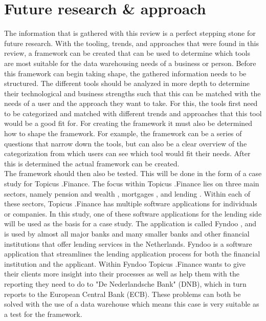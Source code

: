\documentclass[11pt]{article}
\begin{document}
\section{Future research \& approach}
\label{approach}
The information that is gathered with this review is a perfect stepping stone for future research. With the tooling, trends, and approaches that were found in this review, a framework can be created that can be used to determine which tools are most suitable for the data warehousing needs of a business or person. Before this framework can begin taking shape, the gathered information needs to be structured. The different tools should be analyzed in more depth to determine their technological and business strengths such that this can be matched with the needs of a user and the approach they want to take. For this, the tools first need to be categorized and matched with different trends and approaches that this tool would be a good fit for. For creating the framework it must also be determined how to shape the framework. For example, the framework can be a series of questions that narrow down the tools, but can also be a clear overview of the categorization from which users can see which tool would fit their needs. After this is determined the actual framework can be created. \\

The framework should then also be tested. This will be done in the form of a case study for Topicus .Finance. The focus within Topicus .Finance lies on three main sectors, namely pension and wealth \cite{pension},  mortgages \cite{mortgages}, and lending \cite{businesslending}. Within each of these sectors, Topicus .Finance has multiple software applications for individuals or companies. In this study, one of these software applications for the lending side will be used as the basis for a case study. The application is called Fyndoo \cite{fyndoo}, and is used by almost all major banks and many smaller banks and other financial institutions that offer lending services in the Netherlands. Fyndoo is a software application that streamlines the lending application process for both the financial institution and the applicant. Within Fyndoo Topicus .Finance wants to give their clients more insight into their processes as well as help them with the reporting they need to do to "De Nederlandsche Bank" (DNB), which in turn reports to the European Central Bank (ECB). These problems can both be solved with the use of a data warehouse which means this case is very suitable as a test for the framework. \\
\end{document}
